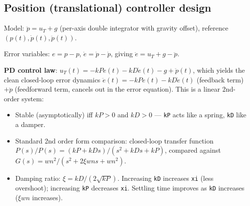 \documentclass[11pt]{article}
\begin{document}
\subsection{Position (translational) controller design}
Model: $\ddot{p} = u_T + g$ (per-axis double integrator with gravity offset), reference $(p (t), \dot{p} (t), \ddot{p} (t))$.

Error variables: $e = p - p $, $\dot{e} = \dot{p} - \dot{p} $, giving $\ddot{e} = u_T + g - \ddot{p} $.

\textbf{PD control law}: $u_T(t) = -kP e(t) - kD \dot{e}(t) - g + \ddot{p} (t)$, which yields the clean closed-loop error dynamics $\ddot{e}(t) = -kP e(t) - kD \dot{e}(t)$ (feedback term) $+ \ddot{p} $ (feedforward term, cancels out in the error equation). This is a linear 2nd-order system:
\begin{itemize}
\item Stable (asymptotically) iff $kP > 0$ and $kD > 0$ — \texttt{kP} acts like a spring, \texttt{kD} like a damper.
\item Standard 2nd order form comparison: closed-loop transfer function $P(s)/P (s) = (kP + kD s) / (s^2 + kD s + kP)$, compared against $G(s) = wn^2/(s^2 + 2 \xi wn s + wn^2)$.
\item Damping ratio: $\xi = kD / (2 \sqrt{kP})$. Increasing \texttt{kD} increases \texttt{xi} (less overshoot); increasing \texttt{kP} decreases \texttt{xi}. Settling time improves as \texttt{kD} increases ($\xi wn$ increases).
\end{itemize}
\end{document}
